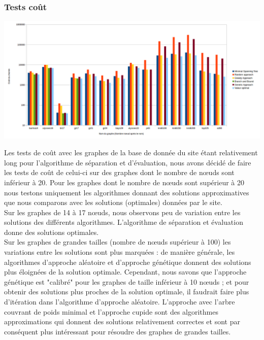 \documentclass[10pt,a4paper]{report}
\begin{document}
	\subsubsection{Tests coût}
			\includegraphics[scale=0.45]{./Ressource/cout_graphes_site.png}
			\begin{flushleft}
			Les tests de coût avec les graphes de la base de donnée du site étant relativement long pour l'algorithme de séparation et d'évaluation, nous avons décidé de faire les tests de coût de celui-ci sur des graphes dont le nombre de nœuds sont inférieur à 20. Pour les graphes dont le nombre de nœuds sont supérieur à 20 nous testons uniquement les algorithmes donnant des solutions approximatives que nous comparons avec les solutions (optimales) données par le site.\\
			Sur les graphes de 14 à 17 nœuds, nous observons peu de variation entre les solutions des différents algorithmes. L'algorithme de séparation et évaluation donne des solutions optimales.\\
			Sur les graphes de grandes tailles (nombre de nœuds supérieur à 100) les variations entre les solutions sont plus marquées  : de manière générale, les algorithmes d'approche aléatoire et d'approche génétique donnent des solutions plus éloignées de la solution optimale. Cependant, nous savons que  l'approche génétique est "calibré" pour les graphes de taille inférieur à 10 nœuds ;  et pour obtenir des solutions plus proches de la solution optimale, il faudrait faire plus d'itération dans l'algorithme d'approche aléatoire.
			L'approche avec l'arbre couvrant de poids minimal et l'approche cupide sont des algorithmes approximations qui donnent des solutions relativement correctes et sont par conséquent plus intéressant pour résoudre des graphes de grandes tailles.
			\end{flushleft}
\end{document}
